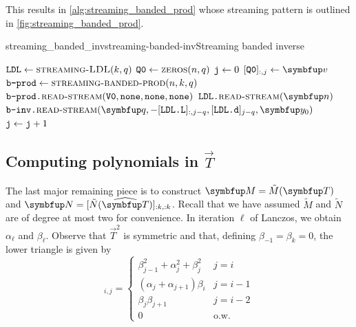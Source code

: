 This results in \cref{alg:streaming_banded_prod} whose streaming pattern is outlined in \cref{fig:streaming_banded_prod}.


\begin{labelalgorithm}[htb]{streaming_banded_inv}{streaming-banded-inv}{Streaming banded inverse}
\begin{algorithmic}[1]
\State $\texttt{LDL} \gets \textsc{streaming-LDL}(k,q)$
\State $\texttt{Q0} \gets \textsc{zeros}(n,q)$
\State $\texttt{j}\gets0$
\State $[\ms{Q0}]_{:,j} \gets \vec{v}$
    \State $\texttt{b-prod} \gets \textsc{streaming-banded-prod}(n,k,q)$
    \State $\texttt{b-prod.}\textsc{read-stream}(\texttt{V0},\texttt{none},\texttt{none},\texttt{none})$
\EndIf
\Else
\State $\ms{LDL.}\textsc{read-stream}(\vec{n})$
\State $\ms{b-inv.}\textsc{read-stream}(\vec{q},-[\ms{LDL.}\ms{L}]_{:,j-q},[\ms{LDL.}\ms{d}]_{j-q},\vec{y}_0)$
\EndIf
\State $\texttt{j}\gets \texttt{j}+1$
\EndProcedure
\EndClass
\end{algorithmic}
\end{labelalgorithm}



\subsection{Computing polynomials in $\vec{T}$}

The last major remaining piece is to construct $\vec{M} = \tilde{M}\mf{\vec{T}}$ and $\vec{N} = [\tilde{N}\mf{\widehat{\vec{T}}}]_{:k,:k}$.
Recall that we have assumed $\tilde{M}$ and $\tilde{N}$ are of degree at most two for convenience.
In iteration $\ell$ of Lanczos, we obtain $\alpha_{\ell}$ and $\beta_{\ell}$.
Observe that $\vec{T}^2$ is symmetric and that, defining $\beta_{-1} = \beta_{k} = 0$, the lower triangle is given by
\begin{equation*}
    [\vec{T}^2]_{i,j}
    = 
    \begin{cases}
    \beta_{j-1}^2 + \alpha_j^2 + \beta_j^2 & j=i \\
    (\alpha_j + \alpha_{j+1}) \beta_i & j=i-1 \\
    \beta_j \beta_{j+1} & j = i-2 \\ 
    0 & \text{o.w.}
    \end{cases}
\end{equation*}



